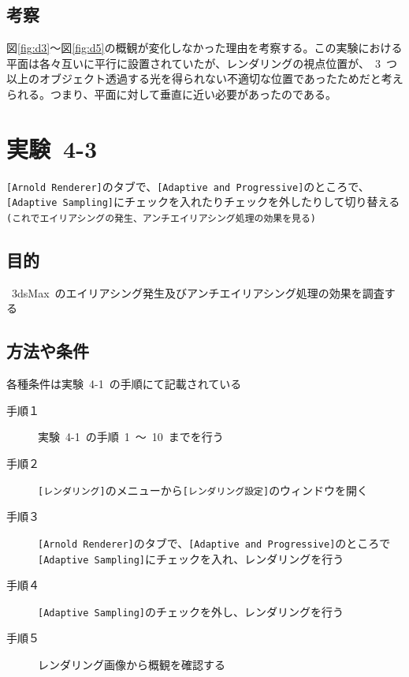 \documentclass[a4j]{jarticle}
\begin{document}
\subsection{考察}
%
図\ref{fig:d3}～図\ref{fig:d5}の概観が変化しなかった理由を考察する。この実験における平面は各々互いに平行に設置されていたが、レンダリングの視点位置が、\ 3\ つ以上のオブジェクト透過する光を得られない不適切な位置であったためだと考えられる。つまり、平面に対して垂直に近い必要があったのである。
%

\newpage
\section{実験\ 4-3}
\verb|[Arnold Renderer]|のタブで、\verb|[Adaptive and Progressive]|のところで、\verb|[Adaptive Sampling]|にチェックを入れたりチェックを外したりして切り替える\verb|(これでエイリアシングの発生、アンチエイリアシング処理の効果を見る)|
\subsection{目的}
%
\ 3dsMax\ のエイリアシング発生及びアンチエイリアシング処理の効果を調査する
%
\subsection{方法や条件}
%
各種条件は実験\ 4-1\ の手順にて記載されている
\begin{description}
  \item[手順１] 実験\ 4-1\ の手順\ 1\ ～\ 10\ までを行う
  \item[手順２] \verb|[レンダリング]|のメニューから\verb|[レンダリング設定]|のウィンドウを開く
  \item[手順３] \verb|[Arnold Renderer]|のタブで、\verb|[Adaptive and Progressive]|のところで\verb|[Adaptive Sampling]|にチェックを入れ、レンダリングを行う
  \item[手順４] \verb|[Adaptive Sampling]|のチェックを外し、レンダリングを行う
  \item[手順５] レンダリング画像から概観を確認する
\end{description}
%
\end{document}
